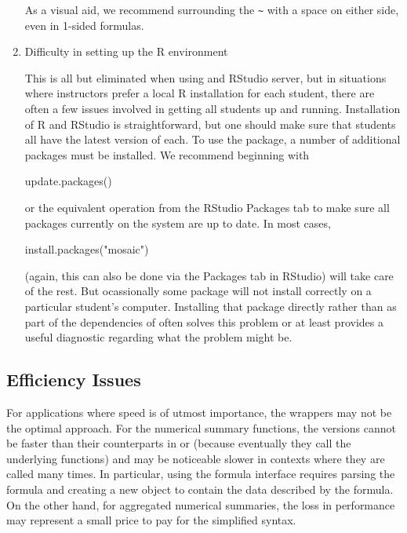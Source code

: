 \begin{enumerate}
  As a visual aid, we recommend surrounding the
  \texttt{\textasciitilde{}} with a space on either side, even in
  1-sided formulas.
\item
  Difficulty in setting up the R environment

  This is all but eliminated when using and RStudio server, but in
  situations where instructors prefer a local R installation for each
  student, there are often a few issues involved in getting all students
  up and running. Installation of R and RStudio is straightforward, but
  one should make sure that students all have the latest version of
  each. To use the  package, a number of additional packages
  must be installed. We recommend beginning with

  \begin{Schunk}
  \begin{Sinput}
  update.packages()
  \end{Sinput}
  \end{Schunk}

  or the equivalent operation from the RStudio Packages tab to make sure
  all packages currently on the system are up to date. In most cases,

  \begin{Schunk}
  \begin{Sinput}
  install.packages("mosaic")
  \end{Sinput}
  \end{Schunk}

  (again, this can also be done via the Packages tab in RStudio) will
  take care of the rest. But ocassionally some package will not install
  correctly on a particular student's computer. Installing that package
  directly rather than as part of the dependencies of  often
  solves this problem or at least provides a useful diagnostic regarding
  what the problem might be.
\end{enumerate}

\subsection{Efficiency Issues}\label{efficiency-issues}

For applications where speed is of utmost importance, the 
wrappers may not be the optimal approach. For the numerical summary
functions, the  versions cannot be faster than their
counterparts in  or  (because eventually they call
the underlying functions) and may be noticeable slower in contexts where
they are called many times. In particular, using the formula interface
requires parsing the formula and creating a new object to contain the
data described by the formula. On the other hand, for aggregated
numerical summaries, the loss in performance may represent a small price
to pay for the simplified syntax.

